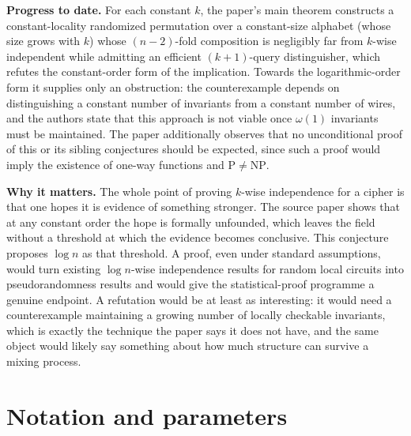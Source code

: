 \documentclass{conjura-conjecture}
\begin{document}
\textbf{Progress to date.} For each constant $k$, the paper's main
theorem constructs a constant-locality randomized permutation over a
constant-size alphabet (whose size grows with $k$) whose $(n-2)$-fold
composition is negligibly far from $k$-wise independent while admitting
an efficient $(k+1)$-query distinguisher, which refutes the
constant-order form of the implication. Towards the logarithmic-order
form it supplies only an obstruction: the counterexample depends on
distinguishing a constant number of invariants from a constant number of
wires, and the authors state that this approach is not viable once
$\omega(1)$ invariants must be maintained. The paper additionally
observes that no unconditional proof of this or its sibling conjectures
should be expected, since such a proof would imply the existence of
one-way functions and $\mathrm{P} \neq \mathrm{NP}$.

\textbf{Why it matters.} The whole point of proving $k$-wise
independence for a cipher is that one hopes it is evidence of something
stronger. The source paper shows that at any constant order the hope is
formally unfounded, which leaves the field without a threshold at which
the evidence becomes conclusive. This conjecture proposes $\log n$ as
that threshold. A proof, even under standard assumptions, would turn
existing $\log n$-wise independence results for random local circuits
into pseudorandomness results and would give the statistical-proof
programme a genuine endpoint. A refutation would be at least as
interesting: it would need a counterexample maintaining a growing number
of locally checkable invariants, which is exactly the technique the
paper says it does not have, and the same object would likely say
something about how much structure can survive a mixing process.

\section{Notation and parameters}\label{sec:notation}
\end{document}
